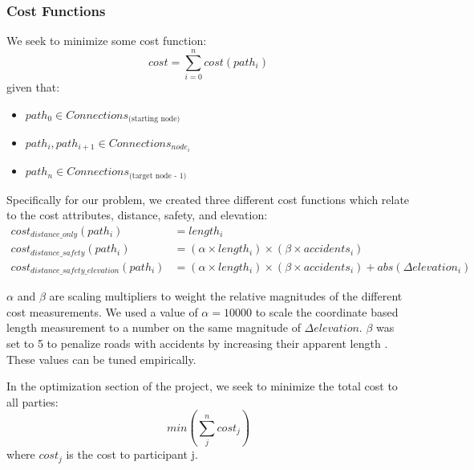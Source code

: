 \documentclass[11pt]{article}
\begin{document}
\subsubsection{Cost Functions}
We seek to minimize some cost function:
\begin{equation}
cost = \sum_{i=0}^n cost(path_i)
\end{equation}
given that:
\begin{itemize}
\item $path_0 \in Connections_{\text{(starting node)}}$
\item $path_i, path_{i+1} \in Connections_{node_i}$
\item $path_n \in Connections_{\text{(target node - 1)}}$
\end{itemize}

\noindent Specifically for our problem, we created three different cost functions which relate to the cost attributes, distance, safety, and elevation:
\begin{align}\label{cost_fns}
cost_{distance\_only}(path_i) &= length_i \\
cost_{distance\_safety}(path_i) &= (\alpha \times length_i) \times  (\beta \times accidents_i) \\
cost_{distance\_safety\_elevation}(path_i) &= (\alpha \times length_i) \times  (\beta \times accidents_i) + abs(\Delta elevation_i)
\end{align}

\noindent  $\alpha$ and $\beta$ are scaling multipliers to weight the relative magnitudes of the different cost measurements. We used a value of $\alpha = 10000$ to scale the coordinate based length measurement to a number on the same magnitude of $\Delta elevation$. $\beta$ was set to 5 to penalize roads with accidents by increasing their apparent length . These values can be tuned empirically.\par
\noindent In the optimization section of the project, we seek to minimize the total cost to all parties:
\begin{equation}
min(\sum_j^n cost_j)
\end{equation}
where $cost_j$ is the cost to participant j.
\end{document}
